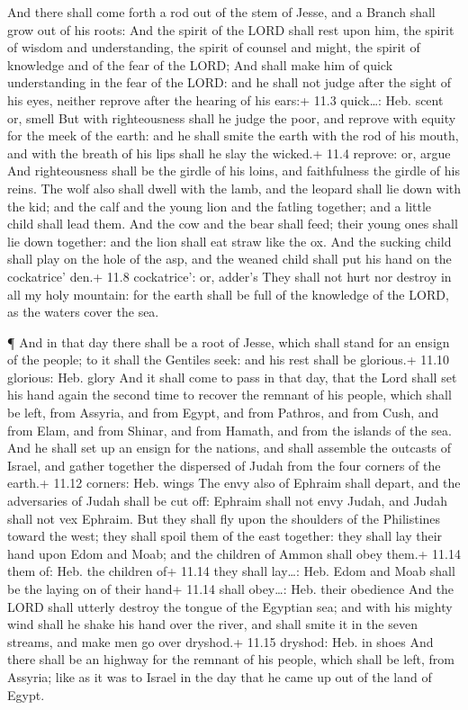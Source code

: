  And there shall come forth a rod out of the stem of Jesse,
and a Branch shall grow out of his roots:  And the spirit of
the LORD shall rest upon him, the spirit of wisdom and understanding,
the spirit of counsel and might, the spirit of knowledge and of the fear
of the LORD;  And shall make him of quick understanding in
the fear of the LORD: and he shall not judge after the sight of his
eyes, neither reprove after the hearing of his ears:+ 11.3 quick\ldots:
Heb. scent or, smell  But with righteousness shall he judge
the poor, and reprove with equity for the meek of the earth: and he
shall smite the earth with the rod of his mouth, and with the breath of
his lips shall he slay the wicked.+ 11.4 reprove: or, argue 
And righteousness shall be the girdle of his loins, and faithfulness the
girdle of his reins.  The wolf also shall dwell with the
lamb, and the leopard shall lie down with the kid; and the calf and the
young lion and the fatling together; and a little child shall lead them.
 And the cow and the bear shall feed; their young ones shall
lie down together: and the lion shall eat straw like the ox.
 And the sucking child shall play on the hole of the asp,
and the weaned child shall put his hand on the cockatrice' den.+ 11.8
cockatrice': or, adder's  They shall not hurt nor destroy in
all my holy mountain: for the earth shall be full of the knowledge of
the LORD, as the waters cover the sea.

 ¶ And in that day there shall be a root of Jesse, which
shall stand for an ensign of the people; to it shall the Gentiles seek:
and his rest shall be glorious.+ 11.10 glorious: Heb. glory
 And it shall come to pass in that day, that the Lord shall
set his hand again the second time to recover the remnant of his people,
which shall be left, from Assyria, and from Egypt, and from Pathros, and
from Cush, and from Elam, and from Shinar, and from Hamath, and from the
islands of the sea.  And he shall set up an ensign for the
nations, and shall assemble the outcasts of Israel, and gather together
the dispersed of Judah from the four corners of the earth.+ 11.12
corners: Heb. wings  The envy also of Ephraim shall depart,
and the adversaries of Judah shall be cut off: Ephraim shall not envy
Judah, and Judah shall not vex Ephraim.  But they shall fly
upon the shoulders of the Philistines toward the west; they shall spoil
them of the east together: they shall lay their hand upon Edom and Moab;
and the children of Ammon shall obey them.+ 11.14 them of: Heb. the
children of+ 11.14 they shall lay\ldots: Heb. Edom and Moab shall be the
laying on of their hand+ 11.14 shall obey\ldots: Heb. their obedience
 And the LORD shall utterly destroy the tongue of the
Egyptian sea; and with his mighty wind shall he shake his hand over the
river, and shall smite it in the seven streams, and make men go over
dryshod.+ 11.15 dryshod: Heb. in shoes  And there shall be
an highway for the remnant of his people, which shall be left, from
Assyria; like as it was to Israel in the day that he came up out of the
land of Egypt.

